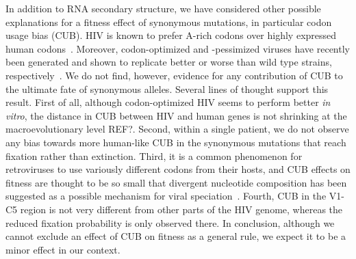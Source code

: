 \documentclass[rmp, twocolumn]{revtex4}
\begin{document}
In addition to RNA secondary structure, we have considered other possible
explanations for a fitness effect of synonymous mutations, in particular codon
usage bias (CUB). HIV is known to prefer A-rich codons over highly expressed
human codons~\citep{jenkins_extent_2003}. Moreover, codon-optimized
and -pessimized viruses have recently been generated and shown to replicate
better or worse than wild type strains,
respectively~\citep{li_codon-usage-based_2012,ngumbela_quantitative_2008,
coleman_virus_2008}. We do not find, however, evidence for any contribution of
CUB to the ultimate fate of synonymous alleles. Several lines of thought support
this result. First of all, although codon-optimized HIV seems to perform better
{\it in vitro}, the distance in CUB between HIV and human genes is not shrinking
at the macroevolutionary level REF?. Second, within a single patient, we do not
observe any bias towards more human-like CUB in the synonymous mutations that
reach fixation rather than extinction. Third, it is a common phenomenon for
retroviruses to use variously different codons from their hosts, and CUB effects
on fitness are thought to be so small that divergent nucleotide composition has
been suggested as a possible mechanism for viral
speciation~\citep{bronson_nucleotide_1994}. Fourth, CUB in the V1-C5 region is
not very different from other parts of the HIV genome, whereas the reduced
fixation probability is only observed there. In conclusion, although we cannot
exclude an effect of CUB on fitness as a general rule, we expect it to be a
minor effect in our context.
\end{document}
